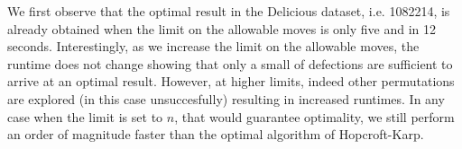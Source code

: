 We first observe that the optimal result in the \textsf{Delicious} dataset, i.e. 1082214, is already obtained when the limit on the allowable moves is only five and in 12 seconds. Interestingly, as we increase the limit on the allowable moves, the runtime does not change showing that only a small of defections are sufficient to arrive at an optimal result. However, at higher limits, indeed other permutations are explored (in this case unsuccesfully) resulting in increased runtimes. In any case when the limit is set to $n$, that would guarantee optimality, we still perform an order of magnitude faster than the optimal algorithm of Hopcroft-Karp. 





